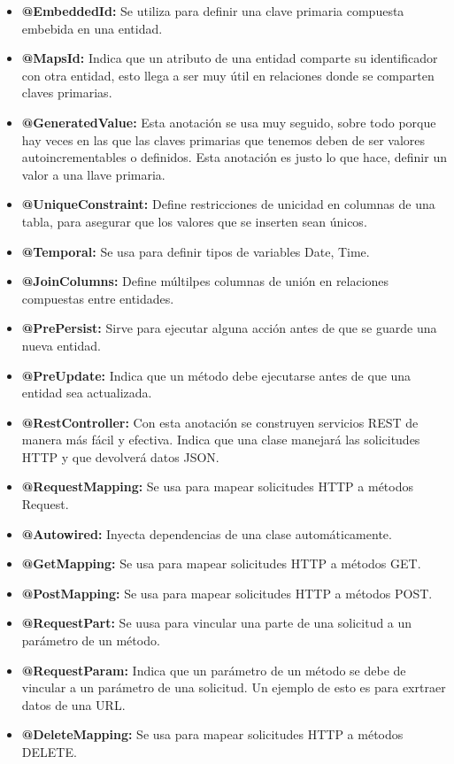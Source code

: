 \begin{itemize}
	\item \textbf{@EmbeddedId:} Se utiliza para definir una clave primaria compuesta embebida en una entidad.
	\item \textbf{@MapsId:} Indica que un atributo de una entidad comparte su identificador con otra entidad, esto llega a ser muy útil en relaciones donde se comparten claves primarias.
	\item \textbf{@GeneratedValue:} Esta anotación se usa muy seguido, sobre todo porque hay veces en las que las claves primarias que tenemos deben de ser valores autoincrementables o definidos. Esta anotación es justo lo que hace, definir un valor a una llave primaria. 
	\item \textbf{@UniqueConstraint:} Define restricciones de unicidad en columnas de una tabla, para asegurar que los valores que se inserten sean únicos.
	\item \textbf{@Temporal:} Se usa para definir tipos de variables Date, Time.
	\item \textbf{@JoinColumns:} Define múltilpes columnas de unión en relaciones compuestas entre entidades.
	\item \textbf{@PrePersist:} Sirve para ejecutar alguna acción antes de que se guarde una nueva entidad.
	\item \textbf{@PreUpdate:} Indica que un método debe ejecutarse antes de que una entidad sea actualizada. 
	\item \textbf{@RestController:} Con esta anotación se construyen servicios REST de manera más fácil y efectiva. Indica que una clase manejará las solicitudes HTTP y que devolverá datos JSON.
	\item \textbf{@RequestMapping:} Se usa para mapear solicitudes HTTP a métodos Request.
	\item \textbf{@Autowired:} Inyecta dependencias de una clase automáticamente.
	\item \textbf{@GetMapping:} Se usa para mapear solicitudes HTTP a métodos GET.
	\item \textbf{@PostMapping:} Se usa para mapear solicitudes HTTP a métodos POST.
	\item \textbf{@RequestPart:} Se uusa para vincular una parte de una solicitud a un parámetro de un método.
	\item \textbf{@RequestParam:} Indica que un parámetro de un método se debe de vincular a un parámetro de una solicitud. Un ejemplo de esto es para exrtraer datos de una URL.
	\item \textbf{@DeleteMapping:} Se usa para mapear solicitudes HTTP a métodos DELETE.

\end{itemize}
